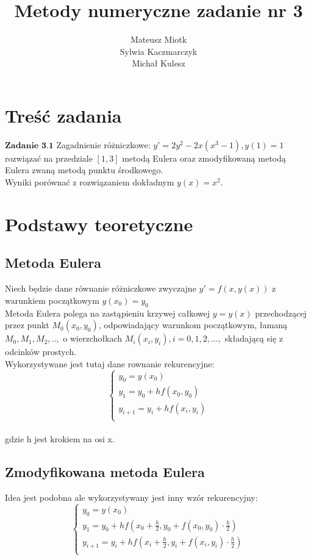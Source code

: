 \documentclass[10pt]{article} %
\title{Metody numeryczne zadanie nr 3}
\author{Mateusz Miotk \\  Sylwia Kaczmarczyk \\ Michał Kulesz}
\begin{document}
\maketitle

\section{Treść zadania}
$\textbf{Zadanie 3.1} $ Zagadnienie różniczkowe: $y'=2y^2 -2x(x^3 - 1) , y(1)=1 $\\
rozwiązać na przedziale $[1,3]$ metodą Eulera oraz zmodyfikowaną metodą Eulera zwaną metodą punktu środkowego.\\
Wyniki porównać z rozwiązaniem dokładnym $y(x) = x^2$.

\section{Podstawy teoretyczne}
\subsection{Metoda Eulera}
Niech będzie dane równanie różniczkowe zwyczajne $y' = f(x,y(x))$ z warunkiem początkowym $y(x_0) = y_0$\\
Metoda Eulera polega na zastąpieniu krzywej całkowej $y = y(x)$ przechodzącej przez punkt $M_0(x_0,y_0)$, odpowiadający 
warunkom początkowym, łamaną $M_0,M_1,M_2,..,$ o wierzchołkach $M_i(x_i,y_i) , i=0,1,2,...,$ składającą się z odcinków prostych.\\
Wykorzystywane jest tutaj dane rownanie rekurencyjne: \\
$$
 \left\{ \begin{array}{ll}
 y_0 = y(x_0)\\
 y_1 = y_0+hf(x_0,y_0)\\
y_{i+1} = y_i + hf(x_i,y_i)\\
\end{array} \right.
$$
\\gdzie h jest krokiem na osi x.\\
\subsection{Zmodyfikowana metoda Eulera}
Idea jest podobna ale wykorzystywany jest inny wzór rekurencyjny: \\
$$
 \left\{ \begin{array}{ll}
 y_0 = y(x_0)\\
 y_1 = y_0+hf(x_0 + \frac{h}{2},y_0 + f(x_0,y_0)\cdot\frac{h}{2})\\
 y_{i+1} = y_i+hf(x_i + \frac{h}{2},y_i + f(x_i,y_i)\cdot\frac{h}{2})\\
\end{array} \right.
$$
\end{document}
